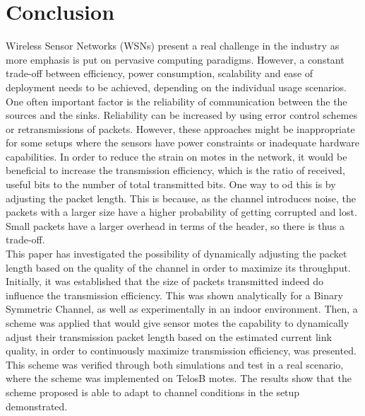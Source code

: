 \section{Conclusion\label{sec:conclusion}}
Wireless Sensor Networks (WSNs) present a real challenge in the industry as more emphasis is put on pervasive computing paradigms. However, a constant trade-off between efficiency, power consumption, scalability and ease of deployment needs to be achieved, depending on the individual usage scenarios. One often important factor is the reliability of communication between the the sources and the sinks. Reliability can be increased by using error control schemes or retransmissions of packets. However, these approaches might be inappropriate for some setups where the sensors have power constraints or inadequate hardware capabilities. 
In order to reduce the strain on motes in the network, it would be beneficial to increase the transmission efficiency, which is the ratio of received, useful bits to the number of total transmitted bits. One way to od this is by adjusting the packet length. This is because, as the channel introduces noise, the packets with a larger size have a higher probability of getting corrupted and lost. Small packets have a larger overhead in terms of the header, so there is thus a trade-off.
\\[8pt]
This paper has investigated the possibility of dynamically adjusting the packet length based on the quality of the channel in order to maximize its throughput. Initially, it was established that the size of packets transmitted indeed do influence the transmission efficiency. This was shown analytically for a Binary Symmetric Channel, as well as experimentally in an indoor environment. Then, a scheme was applied that would give sensor motes the capability to dynamically adjust their transmission packet length based on the estimated current link quality, in order to continuously maximize transmission efficiency, was presented. This scheme was verified through both simulations and test in a real scenario, where the scheme was implemented on TelosB motes. The results show that the scheme proposed is able to adapt to channel conditions in the setup demonstrated. 
